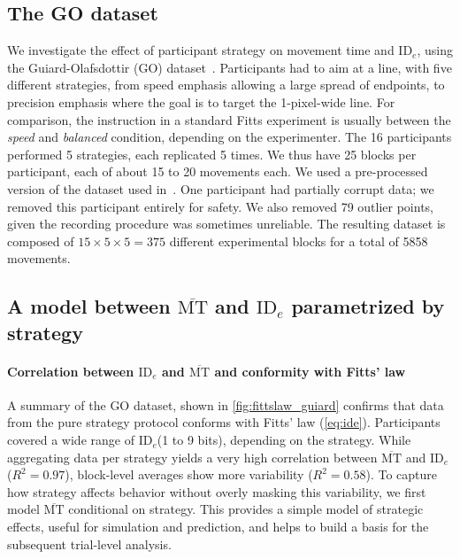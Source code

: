 \documentclass[acmlarge, manuscript,review]{acmart}
\newcommand{\mmt}{\ensuremath{\overline{\mt}}\xspace}
\newcommand{\mt}{\ensuremath{{\text{MT}}}\xspace}
\newcommand{\ide}{\ensuremath{{\text{ID}_e}}\xspace}
\begin{document}
\subsection{The GO dataset}
We investigate the effect of participant strategy on movement time and \ide, using the Guiard-Olafsdottir (GO) dataset~\cite{guiard2011}.
Participants had to aim at a line, with five different strategies, from speed emphasis allowing a large spread of endpoints, to precision emphasis where the goal is to target the 1-pixel-wide line.
For comparison, the instruction in a standard Fitts experiment is usually between the \textit{speed} and \textit{balanced} condition, depending on the experimenter.
The 16 participants performed 5 strategies, each replicated 5 times. We thus have 25 blocks per participant, each of about 15 to 20 movements each.
We used a pre-processed version of the dataset used in~\cite{gori2020}. One participant had partially corrupt data; we removed this participant entirely for safety. We also removed 79 outlier points, given the recording procedure was sometimes unreliable. The resulting dataset is composed of $15 \times 5 \times 5 = 375$ different experimental blocks for a total of 5858 movements.


\subsection{A model between \mmt and \ide parametrized by strategy\label{subs:mmt_ide_strategy}}

\paragraph{Correlation between \ide and \mmt and conformity with Fitts' law}
A summary of the GO dataset, shown in \autoref{fig:fittslaw_guiard} confirms that data from the pure strategy protocol conforms with Fitts' law (\autoref{eq:ide}). Participants covered a wide range of \ide (1 to 9 bits), depending on the strategy.
While aggregating data per strategy yields a very high correlation between \mmt and \ide ($R^2=0.97$), block-level averages show more variability ($R^2=0.58$).
To capture how strategy affects behavior without overly masking this variability, we first model \mmt conditional on strategy. This provides a simple model of strategic effects, useful for simulation and prediction, and helps to build a basis for the subsequent trial-level analysis.
\end{document}
